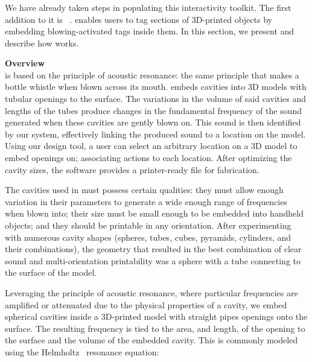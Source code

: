     \subsubsection{\bh}
      We have already taken steps in populating this interactivity toolkit. The
      first addition to it is \bh~\cite{Tejada:2018fj}. \bh enables
      users to tag sections of 3D-printed objects by embedding blowing-activated
      tags inside them. In this section, we present and describe how \bh works.

      \textbf{Overview}\\        
        \bh is based on the principle of acoustic resonance: the same
        principle that makes a bottle whistle when blown across its mouth.
        \bh embeds cavities into 3D models with tubular openings to the
        surface. The variations in the volume of said cavities and lengths of
        the tubes produce changes in the fundamental frequency of the sound
        generated when these cavities are gently blown on. This sound is then
        identified by our system, effectively linking the produced sound to a
        location on the model. Using our design tool, a user can select an
        arbitrary location on a 3D model to embed openings on; associating
        actions to each location. After optimizing the cavity sizes, the
        software provides a printer-ready file for fabrication.
        
        The cavities used in \bh must possess certain qualities: they must
        allow enough variation in their parameters to generate a wide enough
        range of frequencies when blown into; their size must be small enough
        to be embedded into handheld objects; and they should be printable in
        any orientation. After experimenting with numerous cavity shapes
        (spheres, tubes, cubes, pyramids, cylinders, and their 
        combinations), the geometry that resulted in the best combination of
        clear sound and multi-orientation printability was a sphere with a tube
        connecting to the surface of the model.
        
        Leveraging the principle of acoustic resonance, where particular
        frequencies are amplified or attenuated due to the physical properties
        of a cavity, we embed spherical cavities inside a 3D-printed model with
        straight pipes openings onto the surface. The resulting frequency is
        tied to the area, and length, of the opening to the surface and the
        volume of the embedded cavity. This is commonly modeled using the
        Helmholtz~\cite{Helmholtz:1885vp} resonance equation:
        
